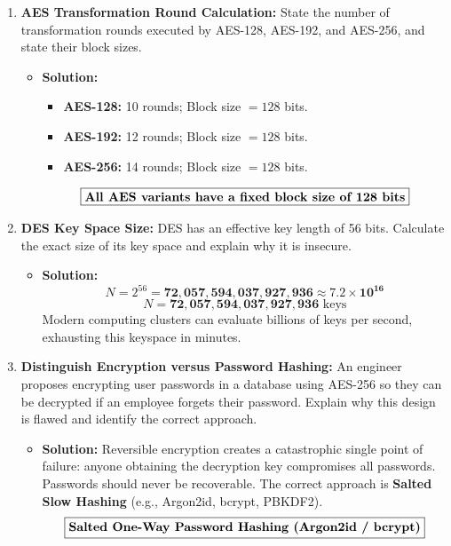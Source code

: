 \begin{enumerate}[label=\textbf{Problem \arabic*.,resume},leftmargin=1.5cm]
\item \textbf{AES Transformation Round Calculation:}
State the number of transformation rounds executed by AES-128, AES-192, and AES-256, and state their block sizes.
\begin{itemize}
\item \textbf{Solution:}
\begin{itemize}
\item \textbf{AES-128:} 10 rounds; Block size $= 128$ bits.
\item \textbf{AES-192:} 12 rounds; Block size $= 128$ bits.
\item \textbf{AES-256:} 14 rounds; Block size $= 128$ bits.
\end{itemize}
\[ \boxed{\text{\textbf{All AES variants have a fixed block size of 128 bits}}} \]
\end{itemize}

\item \textbf{DES Key Space Size:}
DES has an effective key length of 56 bits. Calculate the exact size of its key space and explain why it is insecure.
\begin{itemize}
\item \textbf{Solution:}
\[ N = 2^{56} = \mathbf{72,057,594,037,927,936} \approx \mathbf{7.2 \times 10^{16}} \]
\[ \boxed{N = \mathbf{72,057,594,037,927,936} \text{ keys}} \]
Modern computing clusters can evaluate billions of keys per second, exhausting this keyspace in minutes.
\end{itemize}

\item \textbf{Distinguish Encryption versus Password Hashing:}
An engineer proposes encrypting user passwords in a database using AES-256 so they can be decrypted if an employee forgets their password. Explain why this design is flawed and identify the correct approach.
\begin{itemize}
\item \textbf{Solution:} Reversible encryption creates a catastrophic single point of failure: anyone obtaining the decryption key compromises all passwords. Passwords should never be recoverable. The correct approach is \textbf{Salted Slow Hashing} (e.g., Argon2id, bcrypt, PBKDF2).
\[ \boxed{\text{\textbf{Salted One-Way Password Hashing (Argon2id / bcrypt)}}} \]
\end{itemize}


\end{enumerate}
